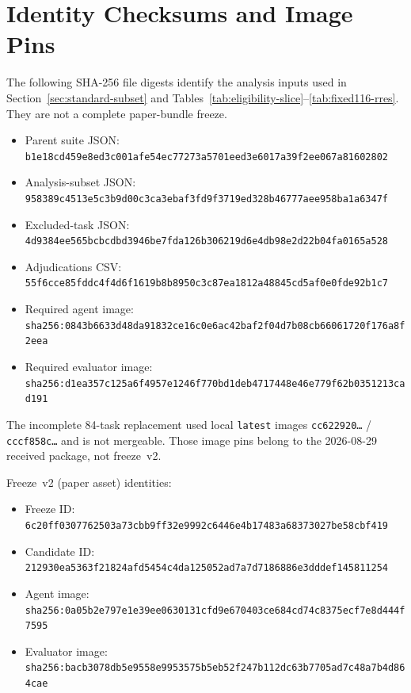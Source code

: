 \documentclass[acmsmall,anonymous,review,screen]{acmart}
\begin{document}
\begin{table}[t]
  \caption{C4 test-overlap: predecessor advisory counts versus freeze~v2
  after the six Hidden rewrites.}
  \label{tab:c4-advisory}
  \centering
  
\end{table}

\section{Identity Checksums and Image Pins}
\label{app:artifact}

The following SHA-256 file digests identify the analysis inputs used in
Section~\ref{sec:standard-subset} and Tables~\ref{tab:eligibility-slice}--\ref{tab:fixed116-rres}.
They are not a complete paper-bundle freeze.

\begin{itemize}
  \item Parent suite JSON:
        \texttt{b1e18cd459e8ed3c001afe54ec77273a5701eed3e6017a39f2ee067a81602802}
  \item Analysis-subset JSON:
        \texttt{958389c4513e5c3b9d00c3ca3ebaf3fd9f3719ed328b46777aee958ba1a6347f}
  \item Excluded-task JSON:
        \texttt{4d9384ee565bcbcdbd3946be7fda126b306219d6e4db98e2d22b04fa0165a528}
  \item Adjudications CSV:
        \texttt{55f6cce85fddc4f4d6f1619b8b8950c3c87ea1812a48845cd5af0e0fde92b1c7}
  \item Required agent image:
        \texttt{sha256:0843b6633d48da91832ce16c0e6ac42baf2f04d7b08cb66061720f176a8f2eea}
  \item Required evaluator image:
        \texttt{sha256:d1ea357c125a6f4957e1246f770bd1deb4717448e46e779f62b0351213cad191}
\end{itemize}
The incomplete 84-task replacement used local \texttt{latest} images
\texttt{cc622920\ldots} / \texttt{cccf858c\ldots} and is not mergeable.
Those image pins belong to the 2026-08-29 received package, not freeze~v2.

Freeze~v2 (paper asset) identities:
\begin{itemize}
  \item Freeze ID:
        \texttt{6c20ff0307762503a73cbb9ff32e9992c6446e4b17483a68373027be58cbf419}
  \item Candidate ID:
        \texttt{212930ea5363f21824afd5454c4da125052ad7a7d7186886e3dddef145811254}
  \item Agent image:
        \texttt{sha256:0a05b2e797e1e39ee0630131cfd9e670403ce684cd74c8375ecf7e8d444f7595}
  \item Evaluator image:
        \texttt{sha256:bacb3078db5e9558e9953575b5eb52f247b112dc63b7705ad7c48a7b4d864cae}
\end{itemize}
\end{document}
